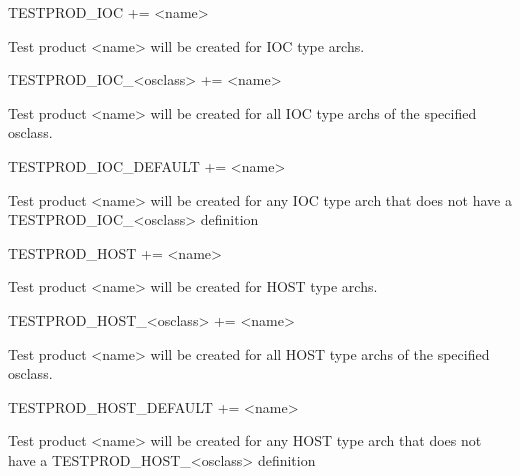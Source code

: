 \begin{description}\item 

\item {}TESTPROD\_IOC += \textless{}name\textgreater{}

\end{description}Test product \textless{}name\textgreater{} will be created for IOC type archs.

\begin{description}\item TESTPROD\_IOC\_\textless{}osclass\textgreater{} += \textless{}name\textgreater{}

\end{description}Test product \textless{}name\textgreater{} will be created for all IOC type archs of the specified osclass.

\begin{description}\item TESTPROD\_IOC\_DEFAULT += \textless{}name\textgreater{}

\end{description}Test product \textless{}name\textgreater{} will be created for any IOC type arch that does not have a 
TESTPROD\_IOC\_\textless{}osclass\textgreater{} definition



\begin{description}\item {}TESTPROD\_HOST += \textless{}name\textgreater{}

\end{description}Test product \textless{}name\textgreater{} will be created for HOST type archs.

\begin{description}\item TESTPROD\_HOST\_\textless{}osclass\textgreater{} += \textless{}name\textgreater{}

\end{description}Test product \textless{}name\textgreater{} will be created for all HOST type archs of the specified osclass.

\begin{description}\item TESTPROD\_HOST\_DEFAULT += \textless{}name\textgreater{}

\end{description}Test product \textless{}name\textgreater{} will be created for any HOST type arch that does not have a 
TESTPROD\_HOST\_\textless{}osclass\textgreater{} definition

